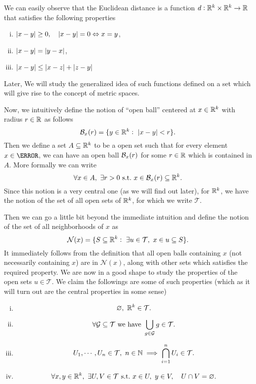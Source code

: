 We can easily observe that the Euclidean distance is a function $d:\mathbb{R}^k\times \mathbb{R}^k \to\mathbb{R}$ that satisfies the following properties
\begin{enumerate}[(i)]
	\item $|x-y| \geq 0, \quad |x-y|=0 \Leftrightarrow x=y$,
	\item $|x-y| = |y-x|$,
	\item $|x-y| \leq |x-z| + |z-y|$
\end{enumerate}
Later, We will study the generalized idea of such functions defined on a set which will give rise to the concept of metric spaces.

Now, we intuitively define the notion of ``open ball'' centered at $x\in\mathbb{R}^k$ with radius $r\in\mathbb{R}$ as follows
\[ \mathcal{B}_{x}(r) = \{ y\in\mathbb{R}^k:\ |x-y|<r \}. \]
Then we define a set $A\subseteq\mathbb{R}^k$ to be a open set such that for every element $x\in\A$, we can have an open ball $\mathcal{B}_{x}(r)$ for some $r\in\mathbb{R}$ which is contained in $A$. More formally we can write
\[ \forall x \in A,\ \exists r>0 \ \text{s.t.}\  x\in\mathcal{B}_{x}(r)\subseteq\mathbb{R}^k. \] 
Since this notion is a very central one (as we will find out later), for $\mathbb{R}^k$, we have the notion of the set of all open sets of $\mathbb{R}^k$, for which we write $\mathcal{T}$.
 
Then we can go a little bit beyond the immediate intuition and define the notion of the set of all neighborhoods of $x$ as
\[ \mathcal{N}(x) = \{ S\subseteq \R^k:\ \exists u\in\mathcal{T},\ x\in u\subseteq S \} . \]
It immediately follows from the definition that all open balls containing $x$ (not necessarily containing $x$) are in $\mathcal{N}(x)$, along with other sets which satisfies the required property. We are now in a good shape to study the properties of the open sets $u\in\mathcal{T}$. We claim the followings are some of such properties (which as it will turn out are the central properties in some sense)
\begin{enumerate}[(i)]
	\item \[\varnothing,\ \mathbb{R}^k \in \mathcal{T}.\]
	\item \[\forall \mathcal{G} \subseteq \mathcal{T} \ \text{we have}\  \bigcup_{g\in\mathcal{G}}g \in \mathcal{T}.\]
	\item \[ U_1,\cdots,U_n \in \mathcal{T},\ n\in\N \implies \bigcap_{i=1}^{n}U_i \in \mathcal{T}.\]
	\item \[ \forall x,y\in\mathbb{R}^k,\ \exists U,V \in \mathcal{T} \ \text{s.t.}\  x\in U,\ y\in V,\quad U\cap V = \varnothing. \]
\end{enumerate}


